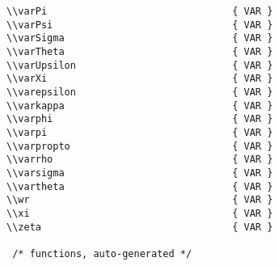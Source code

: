 \begin{verbatim}
\\varPi                                { VAR }
\\varPsi                               { VAR } 
\\varSigma                             { VAR } 
\\varTheta                             { VAR } 
\\varUpsilon                           { VAR } 
\\varXi                                { VAR } 
\\varepsilon                           { VAR } 
\\varkappa                             { VAR } 
\\varphi                               { VAR } 
\\varpi                                { VAR }
\\varpropto                            { VAR } 
\\varrho                               { VAR }
\\varsigma                             { VAR } 
\\vartheta                             { VAR } 
\\wr                                   { VAR }
\\xi                                   { VAR } 
\\zeta                                 { VAR }

 /* functions, auto-generated */


\end{verbatim}
